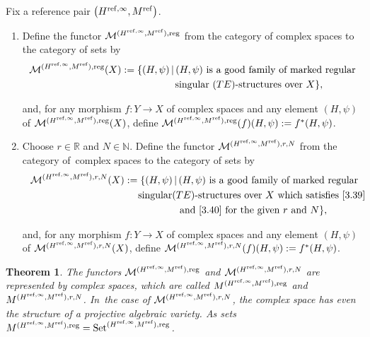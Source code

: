 \documentclass[pdftex]{sigma}%
\numberwithin{equation}{section}
\numberwithin{figure}{section}
\newcommand{\N}{{\mathbb N}}
\newcommand{\R}{{\mathbb R}}
\newcommand{\MM}{{\mathcal M}}
\newtheorem{Theorem}{Theorem}[section]
\begin{document}
\begin{Definition}\label{t3.28}
Fix a reference pair $\big(H^{{\rm ref},\infty},M^{\rm ref}\big)$.
\begin{enumerate}\itemsep=0pt
\item[$(a)$] Define the functor $\MM^{(H^{{\rm ref},\infty},M^{\rm ref}),{\rm reg}}$
from the category of complex spaces to the category of sets by
\begin{gather*}%
\MM^{(H^{{\rm ref},\infty},M^{\rm ref}),{\rm reg}}(X)
:= \{(H,\psi)\,|\, (H,\psi) \text{ is a good family of marked regular}
\\ \hphantom{\MM^{(H^{{\rm ref},\infty},M^{\rm ref}),{\rm reg}}(X):= \{}
\text{singular }(TE)\text{-structures over }X\},
\end{gather*}
{\sloppy
and, for any morphism $f\colon Y\to X$ of complex spaces and any element
$(H,\psi)$ of $\MM^{(H^{{\rm ref},\infty},M^{\rm ref}),{\rm reg}}(X)$, define
$\MM^{(H^{{\rm ref},\infty},M^{\rm ref}),{\rm reg}}(f)(H,\psi):=f^*(H,\psi)$.

}

\item[$(b)$] Choose $r\in\R$ and $N\in \N$.
Define the functor $\MM^{(H^{{\rm ref},\infty},M^{\rm ref}),r,N}$
from the category of~comp\-lex spaces to the category of sets by
\begin{gather*}%
\MM^{(H^{{\rm ref},\infty},M^{\rm ref}),r,N}(X)
:=\{(H,\psi)\,|\, (H,\psi) \text{ is a good family of marked regular }
\\ \hphantom{\MM^{(H^{{\rm ref},\infty},M^{\rm ref}),r,N}(X):=\{}
\text{singular} (TE)\text{-structures over }X
\text{ which satisfies~\eqref{3.39} }
\\ \hphantom{\MM^{(H^{{\rm ref},\infty},M^{\rm ref}),r,N}(X):=\{}
\text{and~\eqref{3.40} for the given }r\text{ and }N\},
\end{gather*}
{\sloppy
and, for any morphism $f\colon Y\to X$ of complex spaces and any element
$(H,\psi)$ of $\MM^{(H^{{\rm ref},\infty},M^{\rm ref}),r,N}(X)$, define
$\MM^{(H^{{\rm ref},\infty},M^{\rm ref}),r,N}(f)(H,\psi):=f^*(H,\psi)$.

}
\end{enumerate}
\end{Definition}


{\sloppy\begin{Theorem}\label{t3.29}
The functors $\MM^{(H^{{\rm ref},\infty},M^{\rm ref}),{\rm reg}}$ and
$\MM^{(H^{{\rm ref},\infty},M^{\rm ref}),r,N}$ are represented by
complex spaces, which are called
$M^{(H^{{\rm ref},\infty},M^{\rm ref}),{\rm reg}}$ and
$M^{(H^{{\rm ref},\infty},M^{\rm ref}),r,N}$. In~the case of $\MM^{(H^{{\rm ref},\infty},M^{\rm ref}),r,N}$, the complex space
has even the structure of a projective algebraic variety.
As sets $M^{(H^{{\rm ref},\infty},M^{\rm ref}),{\rm reg}}
={\rm Set}^{(H^{{\rm ref},\infty},M^{\rm ref}),{\rm reg}}$.
\end{Theorem}

}
\end{document}

